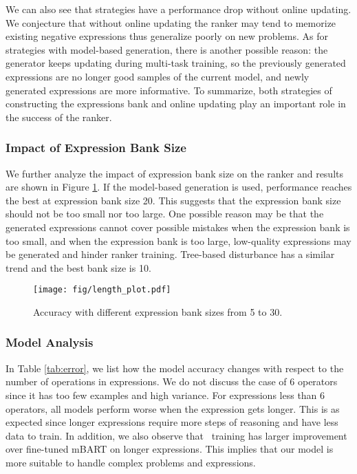We can also see that strategies have a performance drop without online updating. We conjecture that without online updating the ranker may tend to memorize existing negative expressions thus generalize poorly on new problems. As for strategies with model-based generation, there is another possible reason: the generator keeps updating during multi-task training, so the previously generated expressions are no longer good samples of the current model, and newly generated expressions are more informative. To summarize, both strategies of constructing the expressions bank and online updating play an important role in the success of the ranker.

\subsubsection{Impact of Expression Bank Size}
We further analyze the impact of expression bank size on the ranker and results are shown in Figure \ref{fig:bank_size}. If the model-based generation is used, performance reaches the best at expression bank size 20. This suggests that the expression bank size should not be too small nor too large. One possible reason may be that the generated expressions cannot cover possible mistakes when the expression bank is too small, and when the expression bank is too large, low-quality expressions may be generated and hinder ranker training. Tree-based disturbance has a similar trend and the best bank size is 10.


\begin{figure}[th]
    \centering
    \texttt{[image: fig/length\_plot.pdf]}
    \caption{Accuracy with different expression bank sizes from 5 to 30.}
    \label{fig:bank_size}
\end{figure}

















\subsubsection{Model Analysis}
In Table \ref{tab:error}, we list how the model accuracy changes with respect to the number of operations in expressions. We do not discuss the case of 6 operators since it has too few examples and high variance. For expressions less than 6 operators, all models perform worse when the expression gets longer. This is as expected since longer expressions require more steps of reasoning and have less data to train. In addition, we also observe that \method\ training has larger improvement over fine-tuned mBART on longer expressions. This implies that our model is more suitable to handle complex problems and expressions.


